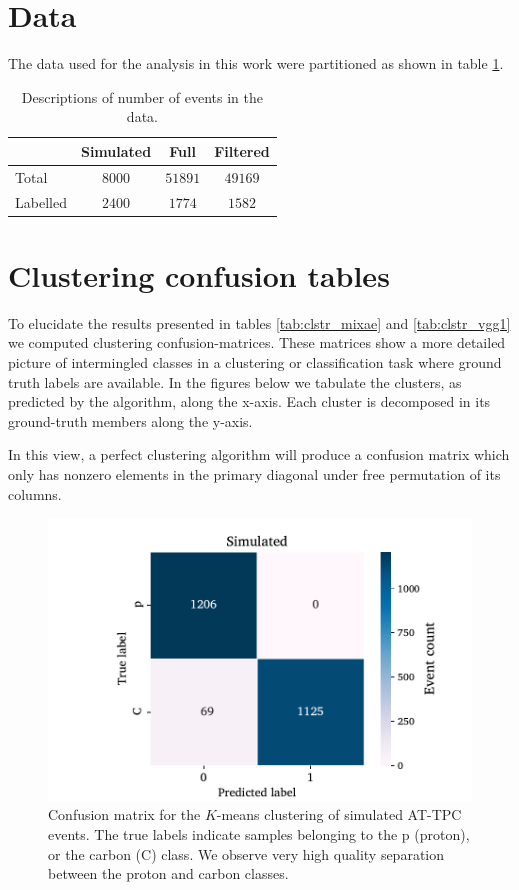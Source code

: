 \documentclass[review,sort&compress]{elsarticle}
\begin{document}
\section{Data}

The data used  for the analysis in this work were partitioned as shown in table \ref{tab:data sets}. 
\begin{table}[hbtp]
\centering
\caption{Descriptions of number of events in the data.}\label{tab:data sets}
\begin{tabular}{lccc}
\toprule
{} & Simulated & Full & Filtered \\
\midrule
Total &  $8000$ & $51891$ & $49169$ \\
Labelled & $2400$ & $1774$ &  $1582$ \\ 
\bottomrule
\end{tabular}
\end{table}

\section{Clustering confusion tables}

To elucidate the results presented in tables \ref{tab:clstr_mixae} and \ref{tab:clstr_vgg1} we computed clustering confusion-matrices. These matrices show a more detailed picture of intermingled classes in a clustering or classification task where ground truth labels are available. In the figures below we tabulate the clusters, as predicted by the algorithm, along the x-axis. Each cluster is decomposed in its ground-truth members along the y-axis.

In this view, a perfect clustering algorithm will produce a confusion matrix which only has nonzero elements in the primary diagonal under free permutation of its columns. 


\begin{figure}
\centering
	\includegraphics[width=\textwidth]{custom_work/Simulatedvgg_conf_mat.pdf} 
	\caption[Pre-trained network - confusion matrices]{Confusion matrix for the $K$-means clustering of simulated AT-TPC events. The true labels indicate samples belonging to the p (proton), or the carbon (C) class. We observe very high quality separation between the proton and carbon classes.}\label{fig:clster_confmat_sim}
\end{figure}
\end{document}
